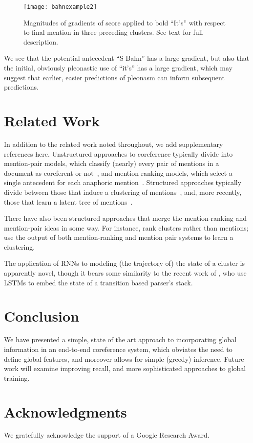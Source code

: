 \documentclass[11pt,letterpaper]{article}
\begin{document}
\begin{figure}[t!]
\centering
\texttt{[image: bahnexample2]}
\caption{Magnitudes of gradients of  score applied to bold ``It's'' with respect to final mention in three preceding clusters. See text for full description.}
\label{fig:flviz}
\end{figure}

We see that the potential antecedent ``S-Bahn'' has a large gradient, but also that the initial, obviously pleonastic use of ``it's'' has a large gradient, which may suggest that earlier, easier predictions of pleonasm can inform subsequent predictions.
 
\section{Related Work}
In addition to the related work noted throughout, we add supplementary references here. Unstructured approaches to coreference typically divide into mention-pair models, which classify (nearly) every pair of mentions in a document as coreferent or not~\cite{soon2001machine,ng2002identifying,BandR:08}, and mention-ranking models, which select a single antecedent for each anaphoric mention~\cite{DandB:08,RandN:09,DandK:13,Chang:13,wiseman15learning}. Structured approaches typically divide between those that induce a clustering of mentions~\cite{mccallum2003toward,culotta2007first,poon08joint,haghighi2010coreference,stoyanov2012easy,cai10end}, and, more recently, those that learn a latent tree of mentions~\cite{fernandes2012latent,BandK:14,martschat15latent}. 
 

There have also been structured approaches that merge the mention-ranking and mention-pair ideas in some way. For instance,  rank clusters rather than mentions;  use the output of both mention-ranking and mention pair systems to learn a clustering.
  
The application of RNNs to modeling (the trajectory of) the state of a cluster is apparently novel, though it bears some similarity to the recent work of , who use LSTMs to embed the state of a transition based parser's stack.
 
\section{Conclusion}
We have presented a simple, state of the art approach to incorporating global information in an end-to-end coreference system, which obviates the need to define global features, and moreover allows for simple (greedy) inference. Future work will examine improving recall, and more sophisticated approaches to global training.

\section*{Acknowledgments}
We gratefully acknowledge the support of a Google Research Award.

\nocite{koehn2004statistical}
\nocite{cort}


\end{document}

